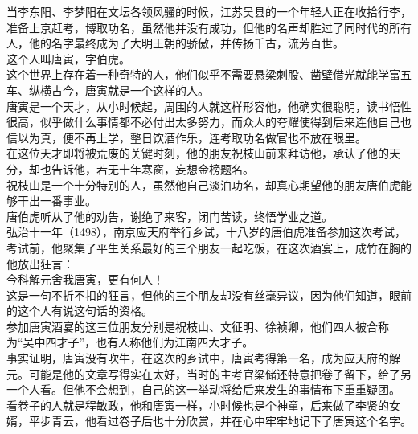 \begin{multicols}{\theparacolNo}
当李东阳、李梦阳在文坛各领风骚的时候，江苏吴县的一个年轻人正在收拾行李，准备上京赶考，博取功名，虽然他并没有成功，但他的名声却胜过了同时代的所有人，他的名字最终成为了大明王朝的骄傲，并传扬千古，流芳百世。\\

这个人叫唐寅，字伯虎。\\

这个世界上存在着一种奇特的人，他们似乎不需要悬梁刺股、凿壁借光就能学富五车、纵横古今，唐寅就是一个这样的人。\\

唐寅是一个天才，从小时候起，周围的人就这样形容他，他确实很聪明，读书悟性很高，似乎做什么事情都不必付出太多努力，而众人的夸耀使得到后来连他自己也信以为真，便不再上学，整日饮酒作乐，连考取功名做官也不放在眼里。\\

在这位天才即将被荒废的关键时刻，他的朋友祝枝山前来拜访他，承认了他的天分，却也告诉他，若无十年寒窗，妄想金榜题名。\\

祝枝山是一个十分特别的人，虽然他自己淡泊功名，却真心期望他的朋友唐伯虎能够干出一番事业。\\

唐伯虎听从了他的劝告，谢绝了来客，闭门苦读，终悟学业之道。\\

弘治十一年（1498），南京应天府举行乡试，十八岁的唐伯虎准备参加这次考试，考试前，他聚集了平生关系最好的三个朋友一起吃饭，在这次酒宴上，成竹在胸的他放出狂言：\\

今科解元舍我唐寅，更有何人！\\

这是一句不折不扣的狂言，但他的三个朋友却没有丝毫异议，因为他们知道，眼前的这个人有说这句话的资格。\\

参加唐寅酒宴的这三位朋友分别是祝枝山、文征明、徐祯卿，他们四人被合称为“吴中四才子”，也有人称他们为江南四大才子。\\

事实证明，唐寅没有吹牛，在这次的乡试中，唐寅考得第一名，成为应天府的解元。可能是他的文章写得实在太好，当时的主考官梁储还特意把卷子留下，给了另一个人看。但他不会想到，自己的这一举动将给后来发生的事情布下重重疑团。\\

看卷子的人就是程敏政，他和唐寅一样，小时候也是个神童，后来做了李贤的女婿，平步青云，他看过卷子后也十分欣赏，并在心中牢牢地记下了唐寅这个名字。\\


\end{multicols}
